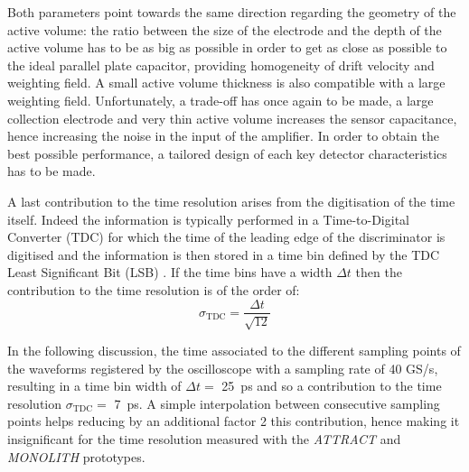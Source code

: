		Both parameters point towards the same direction regarding the geometry of the active volume: the ratio between the size of the electrode and the depth of the active volume has to be as big as possible in order to get as close as possible to the ideal parallel plate capacitor, providing homogeneity of drift velocity and weighting field. A small active volume thickness is also compatible with a large weighting field. Unfortunately, a trade-off has once again to be made, a large collection electrode and very thin active volume increases the sensor capacitance, hence increasing the noise in the input of the amplifier. In order to obtain the best possible performance, a tailored design of each key detector characteristics has to be made. 
		
		A last contribution to the time resolution arises from the digitisation of the time itself. Indeed the information is typically performed in a Time-to-Digital Converter (TDC) for which the time of the leading edge of the discriminator is digitised and the information is then stored in a time bin defined by the TDC Least Significant Bit (LSB) \cite{timepix4}. If the time bins have a width $\Delta t$ then the contribution to the time resolution is of the order of: 
		\begin{equation}
			\sigma_{\text{TDC}} = \frac{\Delta t}{\sqrt{12}}
		\end{equation}
		
		In the following discussion, the time associated to the different sampling points of the waveforms registered by the oscilloscope with a sampling rate of 40 GS/s, resulting in a time bin width of $\Delta t = $ \SI{25}{\pico\second} and so a contribution to the time resolution $\sigma_{\text{TDC}} =$ \SI{7}{\pico\second}. A simple interpolation between consecutive sampling points helps reducing by an additional factor 2 this contribution, hence making it insignificant for the time resolution measured with the \textit{ATTRACT} and \textit{MONOLITH} prototypes. 
	\clearpage
	
	
	
